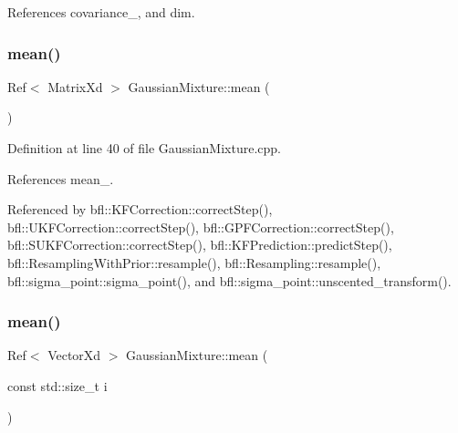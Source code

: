 References covariance\+\_\+, and dim.

\mbox{\label{classbfl_1_1GaussianMixture_af4fd865a97ac27c72510cfbf9429bd97}} 
\subsubsection{\texorpdfstring{mean()}{mean()}\hspace{0.1cm}{\footnotesize\ttfamily [1/6]}}
{\footnotesize\ttfamily Ref$<$ Matrix\+Xd $>$ Gaussian\+Mixture\+::mean (\begin{DoxyParamCaption}{ }\end{DoxyParamCaption})}



Definition at line 40 of file Gaussian\+Mixture.\+cpp.



References mean\+\_\+.



Referenced by bfl\+::\+K\+F\+Correction\+::correct\+Step(), bfl\+::\+U\+K\+F\+Correction\+::correct\+Step(), bfl\+::\+G\+P\+F\+Correction\+::correct\+Step(), bfl\+::\+S\+U\+K\+F\+Correction\+::correct\+Step(), bfl\+::\+K\+F\+Prediction\+::predict\+Step(), bfl\+::\+Resampling\+With\+Prior\+::resample(), bfl\+::\+Resampling\+::resample(), bfl\+::sigma\+\_\+point\+::sigma\+\_\+point(), and bfl\+::sigma\+\_\+point\+::unscented\+\_\+transform().

\mbox{\label{classbfl_1_1GaussianMixture_ad57440f7d524e5129afe70fc36f4fe99}} 
\subsubsection{\texorpdfstring{mean()}{mean()}\hspace{0.1cm}{\footnotesize\ttfamily [2/6]}}
{\footnotesize\ttfamily Ref$<$ Vector\+Xd $>$ Gaussian\+Mixture\+::mean (\begin{DoxyParamCaption}\item[{const std\+::size\+\_\+t}]{i }\end{DoxyParamCaption})}



